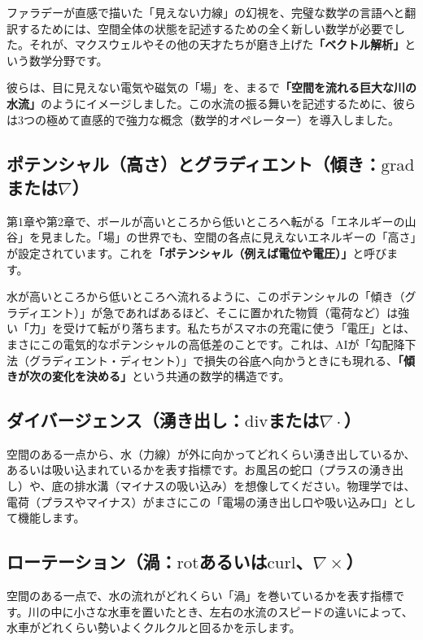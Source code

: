 ファラデーが直感で描いた「見えない力線」の幻視を、完璧な数学の言語へと翻訳するためには、空間全体の状態を記述するための全く新しい数学が必要でした。それが、マクスウェルやその他の天才たちが磨き上げた\textbf{「ベクトル解析」}という数学分野です。

彼らは、目に見えない電気や磁気の「場」を、まるで\textbf{「空間を流れる巨大な川の水流」}のようにイメージしました。この水流の振る舞いを記述するために、彼らは3つの極めて直感的で強力な概念（数学的オペレーター）を導入しました。

\subsection{ポテンシャル（高さ）とグラディエント（傾き：\(\mathrm{grad}\)または\(\nabla\)）}

第1章や第2章で、ボールが高いところから低いところへ転がる「エネルギーの山谷」を見ました。「場」の世界でも、空間の各点に見えないエネルギーの「高さ」が設定されています。これを\textbf{「ポテンシャル（例えば電位や電圧）」}と呼びます。

水が高いところから低いところへ流れるように、このポテンシャルの「傾き（グラディエント）」が急であればあるほど、そこに置かれた物質（電荷など）は強い「力」を受けて転がり落ちます。私たちがスマホの充電に使う「電圧」とは、まさにこの電気的なポテンシャルの高低差のことです。これは、AIが「勾配降下法（グラディエント・ディセント）」で損失の谷底へ向かうときにも現れる、\textbf{「傾きが次の変化を決める」}という共通の数学的構造です。

\subsection{ダイバージェンス（湧き出し：\(\mathrm{div}\)または\(\nabla\cdot\)）}

空間のある一点から、水（力線）が外に向かってどれくらい湧き出しているか、あるいは吸い込まれているかを表す指標です。お風呂の蛇口（プラスの湧き出し）や、底の排水溝（マイナスの吸い込み）を想像してください。物理学では、電荷（プラスやマイナス）がまさにこの「電場の湧き出し口や吸い込み口」として機能します。

\subsection{ローテーション（渦：\(\mathrm{rot}\)あるいは\(\mathrm{curl}\)、\(\nabla\times\)）}

空間のある一点で、水の流れがどれくらい「渦」を巻いているかを表す指標です。川の中に小さな水車を置いたとき、左右の水流のスピードの違いによって、水車がどれくらい勢いよくクルクルと回るかを示します。

